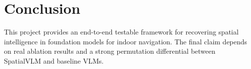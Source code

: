 \section{Conclusion}
This project provides an end-to-end testable framework for recovering spatial intelligence in
foundation models for indoor navigation. The final claim depends on real ablation results and a
strong permutation differential between SpatialVLM and baseline VLMs.
